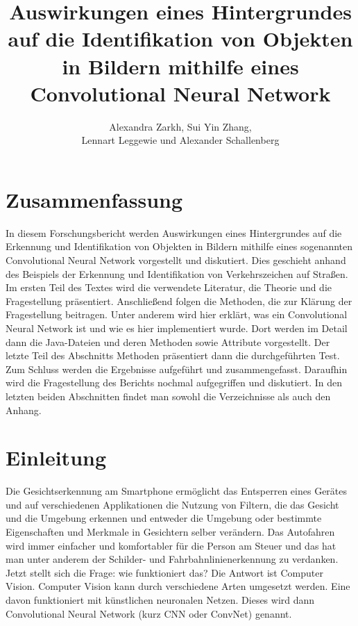 \documentclass[paper=A4,pagesize=auto,12pt,headinclude=true,footinclude=true,BCOR=0mm,DIV=calc]{scrartcl}
\title{Auswirkungen eines Hintergrundes auf die Identifikation von Objekten in Bildern mithilfe eines Convolutional Neural Network}
\author{Alexandra Zarkh, Sui Yin Zhang,\\ Lennart Leggewie und Alexander Schallenberg}
\begin{document}
\begin{titlepage}
	\maketitle
\end{titlepage}

\tableofcontents
\newpage


\section{Zusammenfassung}
In diesem Forschungsbericht werden Auswirkungen eines Hintergrundes auf die Erkennung und Identifikation von Objekten in Bildern mithilfe eines sogenannten Convolutional Neural Network vorgestellt und diskutiert. Dies geschieht anhand des Beispiels der Erkennung und Identifikation von Verkehrszeichen auf Straßen.
Im ersten Teil des Textes wird die verwendete Literatur, die Theorie und die Fragestellung präsentiert. Anschließend folgen die Methoden, die zur Klärung der Fragestellung beitragen. Unter anderem wird hier erklärt, was ein Convolutional Neural Network ist und wie es hier implementiert wurde. Dort werden im Detail dann die Java-Dateien und deren Methoden sowie Attribute vorgestellt. Der letzte Teil des Abschnitts Methoden präsentiert dann die durchgeführten Test.
Zum Schluss werden die Ergebnisse aufgeführt und zusammengefasst. Daraufhin wird die Fragestellung des Berichts nochmal aufgegriffen und diskutiert. In den letzten beiden Abschnitten findet man sowohl die Verzeichnisse als auch den Anhang.


\section{Einleitung} %
Die Gesichtserkennung am Smartphone ermöglicht das Entsperren eines Gerätes und auf verschiedenen Applikationen die Nutzung von Filtern, die das Gesicht und die Umgebung erkennen und entweder die Umgebung oder bestimmte Eigenschaften und Merkmale in Gesichtern selber verändern.
Das Autofahren wird immer einfacher und komfortabler für die Person am Steuer und das hat man unter anderem der Schilder- und Fahrbahnlinienerkennung zu verdanken. Jetzt stellt sich die Frage: wie funktioniert das? Die Antwort ist Computer Vision. Computer Vision kann durch verschiedene Arten umgesetzt werden. Eine davon funktioniert mit künstlichen neuronalen Netzen. Dieses wird dann Convolutional Neural Network (kurz CNN oder ConvNet) genannt.
\end{document}
